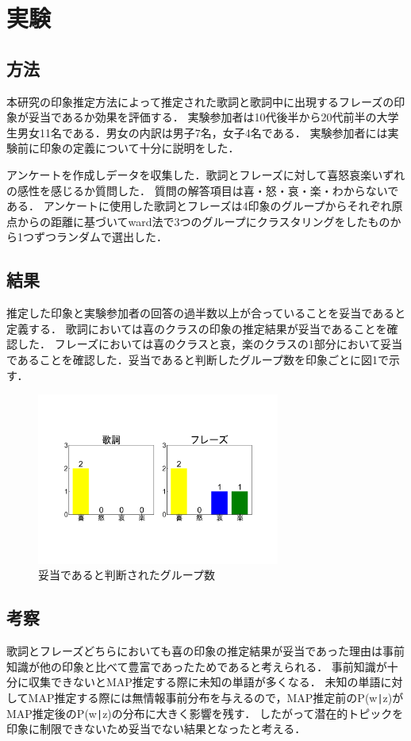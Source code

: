 \documentclass[a4paper,10pt,twocolumn]{jsarticle}
\begin{document}
\section{実験}
\subsection{方法}
本研究の印象推定方法によって推定された歌詞と歌詞中に出現するフレーズの印象が妥当であるか効果を評価する．
実験参加者は10代後半から20代前半の大学生男女11名である．男女の内訳は男子7名，女子4名である．
実験参加者には実験前に印象の定義について十分に説明をした．

アンケートを作成しデータを収集した．歌詞とフレーズに対して喜怒哀楽いずれの感性を感じるか質問した．
質問の解答項目は喜・怒・哀・楽・わからないである．
アンケートに使用した歌詞とフレーズは4印象のグループからそれぞれ原点からの距離に基づいてward法で3つのグループにクラスタリングをしたものから1つずつランダムで選出した．

\subsection{結果}
推定した印象と実験参加者の回答の過半数以上が合っていることを妥当であると定義する．
歌詞においては喜のクラスの印象の推定結果が妥当であることを確認した．
フレーズにおいては喜のクラスと哀，楽のクラスの1部分において妥当であることを確認した．妥当であると判断したグループ数を印象ごとに図1で示す．
\begin{figure}[b]
    \centering
    \includegraphics[angle=-90,width=8cm]{result.pdf}
    \vspace{0mm}
    \caption{妥当であると判断されたグループ数}
    \label{fig:mms}
    \vspace{5mm}
\end{figure}
\subsection{考察}
歌詞とフレーズどちらにおいても喜の印象の推定結果が妥当であった理由は事前知識が他の印象と比べて豊富であったためであると考えられる．
事前知識が十分に収集できないとMAP推定する際に未知の単語が多くなる．
未知の単語に対してMAP推定する際には無情報事前分布を与えるので，MAP推定前のP(w\verb+|+z)がMAP推定後のP(w\verb+|+z)の分布に大きく影響を残す．
したがって潜在的トピックを印象に制限できないため妥当でない結果となったと考える．

%
\end{document}
